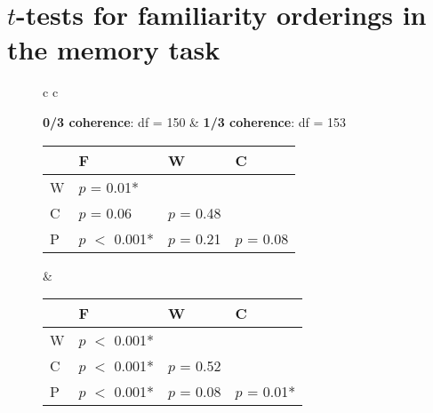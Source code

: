 \section{$t$-tests for familiarity orderings in the memory task}
\begin{figure}[h]
  \begin{center}
    \begin{tabular}{ c c}

      \textbf{0/3 coherence}: df = 150 & \textbf{1/3 coherence}: df = 153\\

      {




      \small

      \begin{tabular}{| l | l |  l | l |}
        \hline
        & F              & W           & C \\
        \hline
        W & $p$ = 0.01*  &             &\\
        \hline
        C & $p$ = 0.06 &  $p$ = 0.48 & \\
        \hline
        P & $p$ $<$ 0.001* &  $p$ = 0.21 &  $p$ = 0.08 \\
        \hline
      \end{tabular}
      } &

          {




          \small
          \begin{tabular}{| l | l |  l | l |}
            \hline
            & F               & W           & C \\
            \hline
            W &  $p$ $<$ 0.001* &             &\\
            \hline
            C &  $p$ $<$ 0.001* &  $p$ = 0.52 &\\
            \hline
            P &  $p$ $<$ 0.001* &  $p$ = 0.08 &  $p$ = 0.01*\\
            \hline
          \end{tabular}
      }\\


\end{tabular}
\end{center}
\end{figure}
